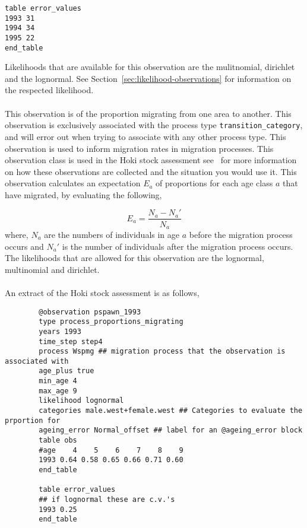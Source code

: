{{{{\begin{itemize}
{{\begin{verbatim}
table error_values
1993 31
1994 34
1995 22
end_table   
\end{verbatim}}}

Likelihoods that are available for this observation are the mulitnomial, dirichlet and the lognormal. See Section~\ref{sec:likelihood-observations} for information on the respected likelihood.

\paragraph*{\label{sec:Proportions-migrating}}
This observation is of the proportion migrating from one area to another. This observation is exclusively associated with the process type \texttt{transition\_category}, and will error out when trying to associate with any other process type. This observation is used to inform migration rates in migration processes. This observation class is used in the Hoki stock assessment see~\cite{francis_03} for more information on how these observations are collected and the situation you would use it. This observation calculates an expectation $E_a$ of proportions for each age class $a$ that have migrated, by evaluating the following,

\begin{equation}
E_a = \frac{N_a - N_a'}{N_a}
\end{equation}
where, $N_a$ are the numbers of individuals in age $a$ before the migration process occurs and $N_a'$ is the number of individuals after the migration process occurs.
\\
The likelihoods that are allowed for this observation are the lognormal, multinomial and dirichlet.
\\\\
An extract of the Hoki stock assessment is as follows,
{\small{\begin{verbatim}
		@observation pspawn_1993
		type process_proportions_migrating
		years 1993
		time_step step4
		process Wspmg ## migration process that the observation is associated with
		age_plus true
		min_age 4
		max_age 9
		likelihood lognormal
		categories male.west+female.west ## Categories to evaluate the prportion for
		ageing_error Normal_offset ## label for an @ageing_error block
		table obs
		#age    4    5    6    7    8    9
		1993 0.64 0.58 0.65 0.66 0.71 0.60
		end_table
		
		table error_values
		## if lognormal these are c.v.'s
		1993 0.25
		end_table
		\end{verbatim}}}
			

\end{itemize}}}}}
